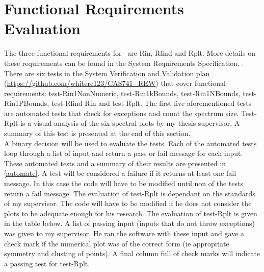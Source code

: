 \documentclass[12pt, titlepage]{article}
\begin{document}
\section{Functional Requirements Evaluation} 

The three functional requirements for \progname \ are Rin, Rfind and 
Rplt. More details on these requirements can be found in the System 
Requirements Specification, \cite{SRS}. There are six tests in the System 
Verification and Validation plan 
(\url{https://github.com/whitere123/CAS741_REW}) that cover functional 
requirements: test-Rin1NonNumeric, test-Rin1kBounds, test-Rin1NBounds, 
test-Rin1PBounds, test-Rfind-Rin and test-Rplt. The first five aforementioned 
tests are 
automated tests that check for exceptions and count the spectrum size.  
Test-Rplt is a visual analysis of the six spectral plots by my thesis 
supervisor. A summary of this test is presented at the end of this section. \\ 
A binary decision will be used to evaluate the tests. Each of the automated 
tests loop through a list of input and return a pass or fail message for each 
input. These automated tests and a summary of their results are presented in 
\ref{automate}. A test will be considered a failure if it returns at least one 
fail 
message. In this case the code will have to be modified until non of the tests 
return a fail message. The evaluation of test-Rplt is dependant on the 
standards of my supervisor. The code will have to be modified if he does not 
consider the plots to be adequate enough for his research. The evaluation of 
test-Rplt is given in the table below. A list of passing input (inputs that do 
not throw exceptions) was given to my supervisor. He ran the software with 
these input and gave a check mark if the numerical plot was of the correct form 
(ie 
appropriate symmetry and clusting of points). A final column full of 
check marks will indicate a passing test for test-Rplt. \\
\end{document}
